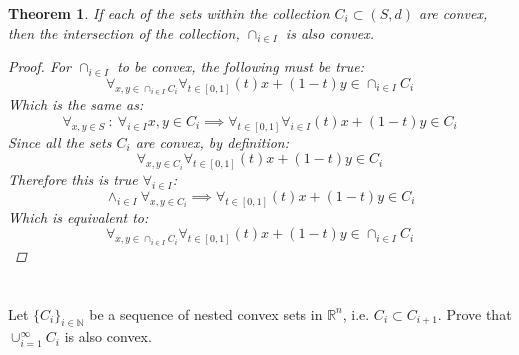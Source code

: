\documentclass[]{article}
\newcommand{\R}{\mathbb{R}}
\newcommand{\N}{\mathbb{N}}
\newcommand{\st}{\ : \ }
\newtheorem{theorem}{Theorem}
\begin{document}
\begin{theorem}
    If each of the sets within the collection $C_i \subset (S,d)$ are convex,
    then the intersection of the collection, $\cap_{i \in I}$ is also convex.
    \begin{proof}
        For $\cap_{i \in I}$ to be convex, the following must be true: \[
            \forall_{x, y \in \cap_{i \in I} C_i} 
                \forall_{t \in [0,1]} (t) x + (1 - t) y \in \cap_{i \in I} C_i
        \]
        Which is the same as: \[
            \forall_{x,y \in S} \st \forall_{i \in I} x,y \in C_i 
                \implies \forall_{t \in [0,1]} \forall_{i \in I} (t) x + (1 - t) y \in C_i
        \]
        Since all the sets $C_i$ are convex, by definition: \[
            \forall_{x, y \in C_i} \forall_{t \in [0,1]} 
                (t) x + (1 - t) y \in C_i
        \]
        Therefore this is true $\forall_{i \in I}$: \[
            \land_{i \in I} \forall_{x,y \in C_i}
                \implies \forall_{t \in [0,1]} (t) x + (1 - t) y \in C_i
        \]
        Which is equivalent to: \[
            \forall_{x, y \in \cap_{i \in I} C_i} 
                \forall_{t \in [0,1]} (t) x + (1 - t) y \in \cap_{i \in I} C_i
        \]

    \end{proof}
\end{theorem}

\newpage
\section{}
Let $\{C_i\}_{i \in \N}$ be a sequence of nested convex sets in $\R^n$, i.e. $C_i \subset C_{i+1}$.
Prove that $\cup_{i = 1}^\infty C_i$ is also convex.
\end{document}
